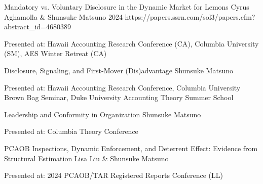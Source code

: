 


\paperentry
	{Mandatory vs. Voluntary Disclosure in the Dynamic Market for Lemons}   %
	{Cyrus Aghamolla \& Shunsuke Matsuno}   %
	{2024}   %
	{https://papers.ssrn.com/sol3/papers.cfm?abstract_id=4680389}  %
	{}   %
	{}   %
	{
	\begin{cvitems} %
		\item {Presented at: Hawaii Accounting Research Conference (CA), Columbia University (SM), AES Winter Retreat (CA)}
	\end{cvitems}
	}

\paperentry
	{Disclosure, Signaling, and First-Mover (Dis)advantage}
	{Shunsuke Matsuno}
	{}
	{}
	{}
	{}
	{
	\begin{cvitems} %
		\item {Presented at: Hawaii Accounting Research Conference, Columbia University Brown Bag Seminar, Duke University Accounting Theory Summer School}
	\end{cvitems}
	}

\vspace{.3cm}


\paperentry
	{Leadership and Conformity in Organization}
	{Shunsuke Matsuno}
	{}
	{}
	{}
	{}
	{
	\begin{cvitems} %
		\item {Presented at: Columbia Theory Conference}
	\end{cvitems}
	}

\paperentry
	{PCAOB Inspections, Dynamic Enforcement, and Deterrent Effect: Evidence from Structural Estimation}
	{Lisa Liu \& Shunsuke Matsuno}
	{}
	{}
	{}
	{}
	{
	\begin{cvitems} %
		\item {Presented at: 2024 PCAOB/TAR Registered Reports Conference (LL)}
	\end{cvitems}
	}




	
